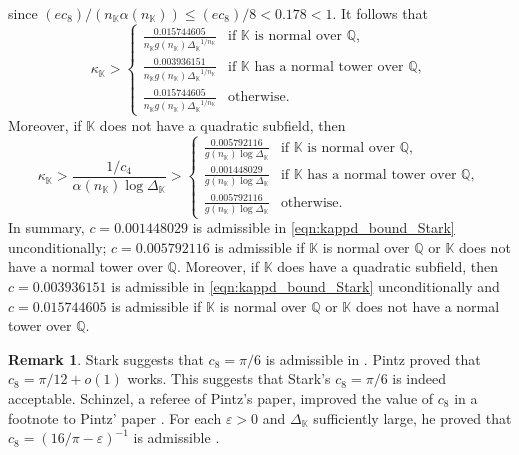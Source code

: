 \documentclass[10pt,reqno]{amsart}
\theoremstyle{plain}
\theoremstyle{definition}
\newtheorem{remark}[theorem]{Remark}
\newcommand{\Q}{\mathbb{Q}}
\newcommand{\K}{\mathbb{K}}
\begin{document}
since $(ec_8)/(n_{\K}\alpha(n_{\K})) \leq (ec_8)/8 < 0.178 < 1$. It follows that
\begin{equation*}
    \kappa_{\K} >
    \begin{cases}
    \frac{0.015744605}{n_{\K}g(n_{\K}){\Delta_{\K}}^{1/n_{\K}}}&\text{if $\K$ is normal over $\Q$},\\[5pt]
    \frac{0.003936151}{n_{\K}g(n_{\K}){\Delta_{\K}}^{1/n_{\K}}}&\text{if $\K$ has a normal tower over $\Q$},\\[5pt]
    \frac{0.015744605}{n_{\K}g(n_{\K}){\Delta_{\K}}^{1/n_{\K}}}&\text{otherwise}.
    \end{cases}
\end{equation*}
Moreover, if $\K$ does not have a quadratic subfield, then
\begin{equation*}
    \kappa_{\K}
    > \frac{1/c_4}{\alpha(n_{\K})\log{\Delta_{\K}}}
    > \begin{cases}
    \frac{0.005792116}{g(n_{\K})\log{\Delta_{\K}}}&\text{if $\K$ is normal over $\Q$},\\[5pt]
    \frac{0.001448029}{g(n_{\K})\log{\Delta_{\K}}}&\text{if $\K$ has a normal tower over $\Q$},\\[5pt]
    \frac{0.005792116}{g(n_{\K})\log{\Delta_{\K}}}&\text{otherwise}.
    \end{cases}
\end{equation*}
In summary, $c = 0.001448029$ is admissible in \eqref{eqn:kappd_bound_Stark} unconditionally; 
$c = 0.005792116$ is admissible if $\K$ is normal over $\Q$ or $\K$ does not have a normal tower over $\Q$. Moreover, if $\K$ does have a quadratic subfield, then $c = 0.003936151$ is admissible in \eqref{eqn:kappd_bound_Stark} unconditionally and $c = 0.015744605$ is admissible if $\K$ is normal over $\Q$ or $\K$ does not have a normal tower over $\Q$.


\begin{remark}\label{Remark:Pintz}
Stark suggests that $c_8 = \pi/6$ is admissible in \cite[Lem.~11]{StarkBS}.
Pintz \cite[Thm.~3]{Pintz76} proved that $c_8 = \pi/12+  o(1)$ works.  
This suggests that Stark's $c_8 = \pi / 6$ is indeed acceptable. 
Schinzel, a referee of Pintz's paper, improved the value of $c_8$ in a footnote to Pintz' paper \cite[p.~277]{Pintz76}.
For each $\varepsilon > 0$ and $\Delta_{\K}$
sufficiently large, he proved that $c_8 = (16/\pi - \varepsilon)^{-1}$ is admissible \cite[p.~277]{Pintz76}.
\end{remark}


\end{document}
